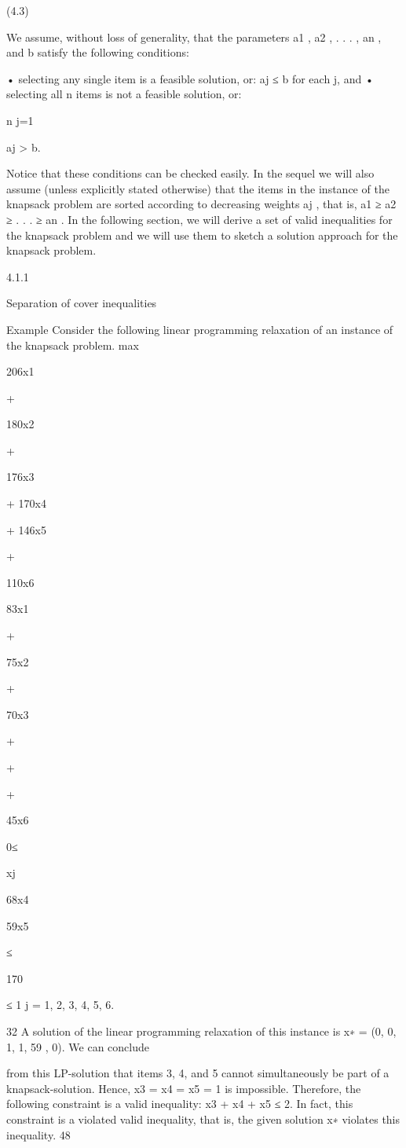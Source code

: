 \documentclass[titlepage]{book}
\theoremstyle{plain}
\theoremstyle{definition}
\theoremstyle{remark}
\begin{document}
(4.3)

We assume, without loss of generality, that the parameters a1 , a2 , . . . , an , and b satisfy the following
conditions:

• selecting any single item is a feasible solution, or: aj ≤ b for each j, and
• selecting all n items is not a feasible solution, or:

n
j=1

aj > b.

Notice that these conditions can be checked easily. In the sequel we will also assume (unless explicitly
stated otherwise) that the items in the instance of the knapsack problem are sorted according to decreasing
weights aj , that is, a1 ≥ a2 ≥ . . . ≥ an . In the following section, we will derive a set of valid inequalities
for the knapsack problem and we will use them to sketch a solution approach for the knapsack problem.

4.1.1

Separation of cover inequalities

Example Consider the following linear programming relaxation of an instance of the knapsack problem.
max

206x1

+

180x2

+

176x3

+ 170x4

+ 146x5

+

110x6

83x1

+

75x2

+

70x3

+

+

+

45x6

0≤

xj

68x4

59x5

≤

170

≤ 1 j = 1, 2, 3, 4, 5, 6.

32
A solution of the linear programming relaxation of this instance is x∗ = (0, 0, 1, 1, 59
, 0). We can conclude

from this LP-solution that items 3, 4, and 5 cannot simultaneously be part of a knapsack-solution. Hence,
x3 = x4 = x5 = 1 is impossible. Therefore, the following constraint is a valid inequality:
x3 + x4 + x5 ≤ 2.
In fact, this constraint is a violated valid inequality, that is, the given solution x∗ violates this inequality.
48
\end{document}
